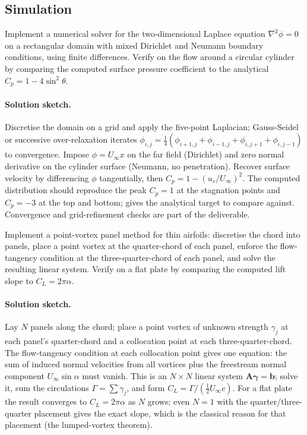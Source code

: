 \subsection*{Simulation}

\begin{exercise}
Implement a numerical solver for the two-dimensional Laplace
equation $\nabla^2 \phi = 0$ on a rectangular domain with mixed
Dirichlet and Neumann boundary conditions, using finite differences.
Verify on the flow around a circular cylinder by comparing the
computed surface pressure coefficient to the analytical $C_p =
1 - 4\sin^2\theta$.

\paragraph{Solution sketch.} Discretise the domain on a grid and
apply the five-point Laplacian; Gauss-Seidel or successive
over-relaxation iterates $\phi_{i,j} = \tfrac14(\phi_{i+1,j} +
\phi_{i-1,j} + \phi_{i,j+1} + \phi_{i,j-1})$ to convergence. Impose
$\phi = U_\infty x$ on the far field (Dirichlet) and zero normal
derivative on the cylinder surface (Neumann, no penetration). Recover
surface velocity by differencing $\phi$ tangentially, then $C_p = 1 -
(u_s/U_\infty)^2$. The computed distribution should reproduce the
peak $C_p = 1$ at the stagnation points and $C_p = -3$ at the top and
bottom;  gives the analytical target
to compare against. Convergence and grid-refinement checks are part
of the deliverable.
\end{exercise}

\begin{exercise}
Implement a point-vortex panel method for thin airfoils: discretise
the chord into panels, place a point vortex at the quarter-chord
of each panel, enforce the flow-tangency condition at the
three-quarter-chord of each panel, and solve the resulting linear
system. Verify on a flat plate by comparing the computed lift
slope to $C_L = 2\pi\alpha$.

\paragraph{Solution sketch.} Lay $N$ panels along the chord; place a
point vortex of unknown strength $\gamma_j$ at each panel's
quarter-chord and a collocation point at each three-quarter-chord.
The flow-tangency condition at each collocation point gives one
equation: the sum of induced normal velocities from all vortices plus
the freestream normal component $U_\infty\sin\alpha$ must vanish. This
is an $N\times N$ linear system $\mathbf{A}\boldsymbol{\gamma} =
\mathbf{b}$; solve it, sum the circulations $\Gamma = \sum\gamma_j$,
and form $C_L = \Gamma/(\tfrac12 U_\infty c)$. For a flat plate the
result converges to $C_L = 2\pi\alpha$ as $N$ grows; even $N = 1$ with
the quarter/three-quarter placement gives the exact slope, which is
the classical reason for that placement (the lumped-vortex theorem).
\end{exercise}

